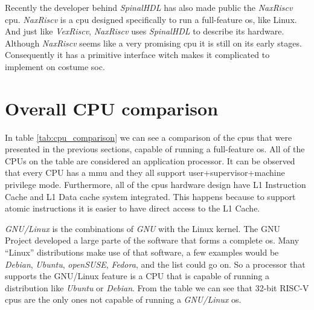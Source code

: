 Recently the developer behind \textit{SpinalHDL} has also made public the \textit{NaxRiscv} \acrshort{cpu}. \textit{NaxRiscv} is a \acrshort{cpu} designed specifically to run a full-feature \acrlong{os}, like Linux. And just like \textit{VexRiscv}, \textit{NaxRiscv} uses \textit{SpinalHDL} to describe its hardware. Although \textit{NaxRiscv} seems like a very promising \acrshort{cpu} it is still on its early stages. Consequently it has a primitive interface witch makes it complicated to implement on costume \acrfull{soc}.


\section{Overall CPU comparison}
In table \ref*{tab:cpu_comparison} we can see a comparison of the \acrshort{cpu}s that were presented in the previous sections, capable of running a full-feature \acrfull{os}. All of the CPUs on the table are considered an application processor. It can be observed that every CPU has a \acrfull{mmu} and they all support \acrshort{user}+\acrshort{supervisor}+\acrshort{machine} privilege mode. Furthermore, all of the \acrshort{cpu}s hardware design have L1 Instruction Cache and L1 Data cache system integrated. This happens because to support atomic instructions it is easier to have direct access to the L1 Cache.

\textit{GNU/Linux} is the combinations of \textit{GNU} with the Linux kernel. The GNU Project developed a large parte of the software that forms a complete \acrfull{os}. Many \enquote{Linux} distributions make use of that software, a few examples would be \textit{Debian}, \textit{Ubuntu}, \textit{openSUSE}, \textit{Fedora}, and the list could go on. So a processor that supports the GNU/Linux feature is a CPU that is capable of running a distribution like \textit{Ubuntu} or \textit{Debian}. From the table we can see that 32-bit RISC-V \acrshort{cpu}s are the only ones not capable of running a \textit{GNU/Linux} \acrfull{os}.

